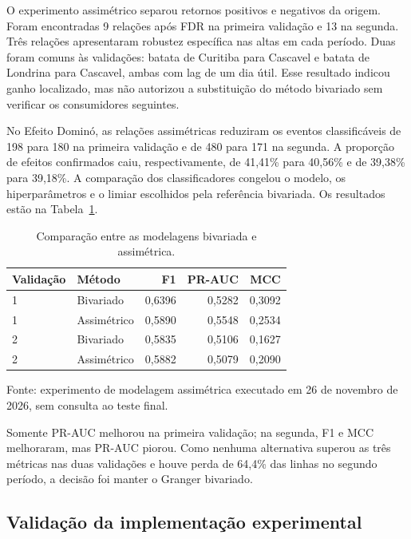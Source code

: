 \documentclass[12pt,a4paper]{article}
\begin{document}
O experimento assimétrico separou retornos positivos e negativos da origem.
Foram encontradas 9 relações após FDR na primeira validação e 13 na segunda.
Três relações apresentaram robustez específica nas altas em cada período. Duas
foram comuns às validações: batata de Curitiba para Cascavel e batata de
Londrina para Cascavel, ambas com lag de um dia útil. Esse resultado indicou
ganho localizado, mas não autorizou a substituição do método bivariado sem
verificar os consumidores seguintes.

No Efeito Dominó, as relações assimétricas reduziram os eventos classificáveis
de 198 para 180 na primeira validação e de 480 para 171 na segunda. A proporção
de efeitos confirmados caiu, respectivamente, de 41,41\% para 40,56\% e de
39,38\% para 39,18\%. A comparação dos classificadores congelou o modelo, os
hiperparâmetros e o limiar escolhidos pela referência bivariada. Os resultados
estão na Tabela~\ref{tab:modelagem-assimetrica}.

\begin{table}[htbp]
    \centering
    \caption{Comparação entre as modelagens bivariada e assimétrica.}
    \label{tab:modelagem-assimetrica}
    \small
    \begin{tabular}{llrrr}
        \toprule
        \textbf{Validação} & \textbf{Método} & \textbf{F1} &
        \textbf{PR-AUC} & \textbf{MCC} \\
        \midrule
        1 & Bivariado & 0,6396 & 0,5282 & 0,3092 \\
        1 & Assimétrico & 0,5890 & 0,5548 & 0,2534 \\
        2 & Bivariado & 0,5835 & 0,5106 & 0,1627 \\
        2 & Assimétrico & 0,5882 & 0,5079 & 0,2090 \\
        \bottomrule
    \end{tabular}

    \par\smallskip
    \footnotesize
    Fonte: experimento de modelagem assimétrica executado em 26 de novembro de
    2026, sem consulta ao teste final.
\end{table}

Somente PR-AUC melhorou na primeira validação; na segunda, F1 e MCC melhoraram,
mas PR-AUC piorou. Como nenhuma alternativa superou as três métricas nas duas
validações e houve perda de 64,4\% das linhas no segundo período, a decisão foi
manter o Granger bivariado.

\subsection{Validação da implementação experimental}
\end{document}
